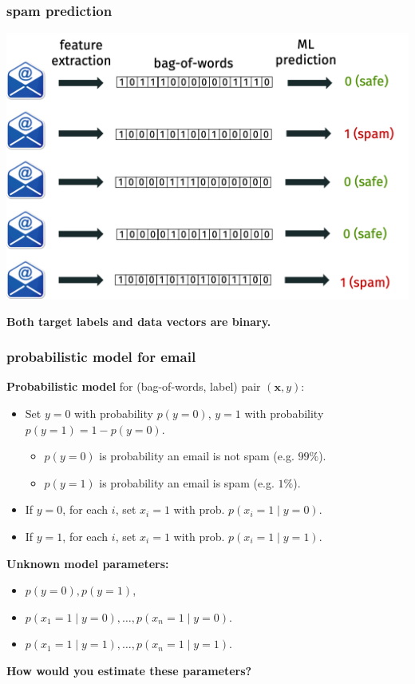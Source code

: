 \documentclass[handout,compress]{beamer}
\newcommand{\bv}[1]{\mathbf{#1}}
\begin{document}
\begin{frame}
	\frametitle{spam prediction}
	\begin{center}
		\includegraphics[width=.9\textwidth]{spam.png}
		
		\vspace{.5em}
		\textbf{Both target labels {and} data vectors are binary.}
	\end{center}
\end{frame}

\begin{frame}
	\frametitle{probabilistic model for email}
	\textbf{Probabilistic model} for  (bag-of-words, label) pair $(\bv{x},y)$:
	\begin{itemize}
		\item Set $y = 0$ with probability $p(y = 0)$, $y = 1$ with probability $p(y = 1) = 1-p(y=0)$. 
		\begin{itemize}
			\item $p(y = 0)$ is probability an email is not spam (e.g. $99\%$). 
			\item $p(y = 1)$ is probability an email is spam (e.g. $1\%$). 
		\end{itemize}
		\item If $y=0$, for each $i$, set $x_i = 1$ with prob. $p(x_i = 1 \mid y=0)$.
		\item If $y=1$, for each $i$, set $x_i = 1$ with prob. $p(x_i = 1\mid y=1)$.
	\end{itemize}

	\alert{\textbf{Unknown model parameters:}} 
	\vspace{-.5em}
	\begin{itemize}
		\item $p(y = 0), p(y = 1)$,
		\item $p(x_1 = 1 \mid y=0), \ldots, p(x_n = 1 \mid y=0)$.
		\item $p(x_1 = 1 \mid y=1), \ldots, p(x_n = 1 \mid y=1)$.
	\end{itemize} 
\begin{center}
	\textbf{How would you estimate these parameters?}
\end{center}
\end{frame}
\end{document}
